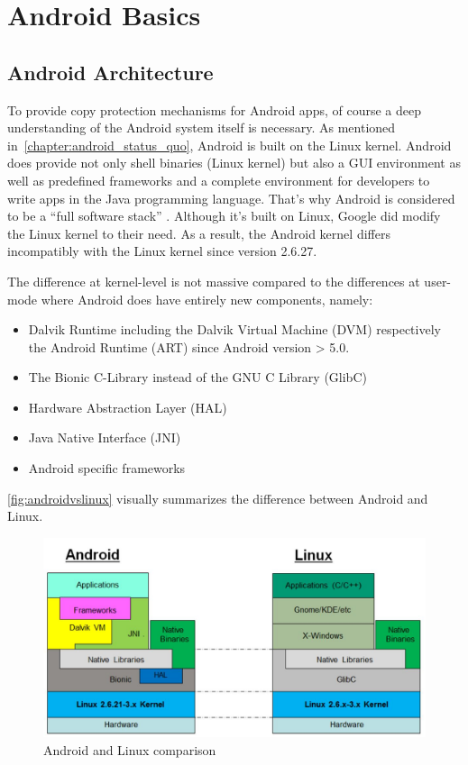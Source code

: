 \chapter{Android Basics}\label{chapter:android_basics}

\section{Android Architecture}\label{section:android_architecture}
To provide copy protection mechanisms for Android apps,
of course a deep understanding of the Android system itself
is necessary. As mentioned in~\autoref{chapter:android_status_quo},
Android is built on the Linux kernel. Android does provide not
only shell binaries (Linux kernel) but also a GUI environment
as well as predefined frameworks and a complete environment
for developers to write apps in the Java programming language.
That's why Android is considered to be a ``full software stack''
\parencite{levin}. Although it's built on Linux,
Google did modify the Linux kernel to their need.
As a result, the Android kernel differs
incompatibly with the Linux kernel since version 2.6.27.

The difference at kernel-level is not massive compared to
the differences at user-mode where Android does have entirely new
components, namely:

\begin{itemize}
\item Dalvik Runtime including the Dalvik Virtual Machine (DVM)
respectively the Android Runtime (ART) since Android version > 5.0.
\item The Bionic C-Library instead of the GNU C Library (GlibC)
\item Hardware Abstraction Layer (HAL)
\item Java Native Interface (JNI)
\item Android specific frameworks
\end{itemize}

\autoref{fig:androidvslinux} visually summarizes the difference
between Android and Linux.

\begin{figure}[htb]
  \includegraphics[width=\textwidth]{figures/androidvslinux}
  \caption[Android vs Linux]{Android and Linux comparison
  ~\parencite{levin}}
  \label{fig:androidvslinux}
\end{figure}

